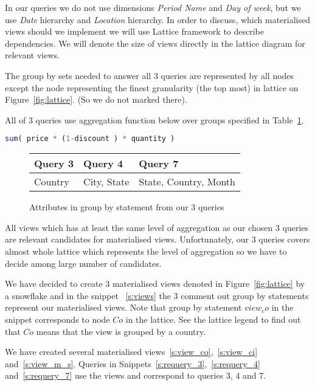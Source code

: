 
 In our queries we do not use dimensions {\it Period Name} and {\it Day of week}, but 
 we use {\it Date} hierarchy and {\it Location} hierarchy. 
 In order to discuss, which materialised views should we implement we will use Lattice framework to describe dependencies. We will denote the size of views directly in the lattice diagram for relevant views.

 The group by sets needed to answer all 3 queries are represented by all nodes except the node representing the finest granularity (the top most) in lattice on Figure~\ref{fig:lattice}. (So we do not marked there).

All of 3 queries use aggregation function below over groups specified in Table~\ref{t:groupby}.
\begin{lstlisting}[language=sql] 
sum( price * (1-discount ) * quantity )
\end{lstlisting}

\begin{figure}[!hbp]
\caption{\label{t:groupby}Attributes in group by statement from our 3 queries}
\begin{center}
\begin{tabular}{|p{3cm}|p{3cm}|p{5cm}|}
\hline
Query 3 & Query 4 & Query  7\\
\hline
\hline
Country & City, State  & State, Country, Month\\
\hline
\end{tabular}
\end{center}
\end{figure}

 All views which has at least the same level of aggregation as our chosen 3 queries are relevant candidates for materialised views. Unfortunately, our 3 queries covers almost whole lattice which represents the level of aggregation so we have to decide among large number of candidates.

We have decided to create 3 materialised views denoted in Figure~\ref{fig:lattice}
by a snowflake and in the snippet ~\ref{s:views} the 3 comment out group by statements represent 
our materialised views. Note that group by statement  $view_co$ in the snippet 
corresponds to node ${Co}$ in the lattice. See the lattice legend to find out that ${Co}$ means that
the view is grouped by a country.

We have created several materialised views~\ref{s:view_co},~\ref{s:view_ci} and~\ref{s:view_m_s}.
Queries in Snippets~\ref{s:requery_3},~\ref{s:requery_4} and~\ref{s:requery_7} use the views and correspond to queries $3$, $4$ and $7$.

